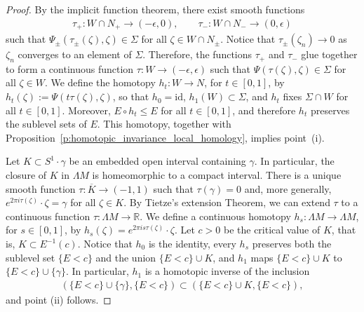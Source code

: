 \documentclass[reqno]{amsart}
\numberwithin{equation}{section}
\theoremstyle{personal}%
\theoremstyle{definition}
\newcommand{\R}{\mathds{R}}
\begin{document}
\begin{proof}
By the implicit function theorem, there exist smooth functions
\begin{align*}
\tau_+:W\cap N_+\to(-\epsilon,0),
\qquad
\tau_-:W\cap N_-\to(0,\epsilon)
\end{align*}
such that $\Psi_{\pm}(\tau_{\pm}(\zeta),\zeta)\in\Sigma$ for all $\zeta\in W\cap N_\pm$. Notice that $\tau_{\pm}(\zeta_n)\to 0$ as $\zeta_n$ converges to an element of $\Sigma$. Therefore, the functions $\tau_+$ and $\tau_-$ glue together to form a continuous function $\tau:W\to(-\epsilon,\epsilon)$ such that $\Psi(\tau(\zeta),\zeta)\in\Sigma$ for all $\zeta\in W$. We define the homotopy $h_t:W\to N$, for $t\in[0,1]$, by $h_t(\zeta):=\Psi(t\tau(\zeta),\zeta)$, so that $h_0=\mathrm{id}$, $h_1(W)\subset\Sigma$, and $h_t$ fixes $\Sigma\cap W$ for all $t\in[0,1]$. Moreover, $E\circ h_t\leq E$ for all $t\in[0,1]$, and therefore $h_t$ preserves the sublevel sets of $E$. This homotopy, together with Proposition~\ref{p:homotopic_invariance_local_homology}, implies point~(i).



Let $K\subset S^1\cdot\gamma$ be an embedded open interval containing $\gamma$. In particular, the closure of $K$ in $\Lambda M$ is homeomorphic to a compact interval. There is a unique smooth function $\tau:\overline K\to(-1,1)$ such that $\tau(\gamma)=0$ and, more generally, $e^{2\pi i\tau(\zeta)}\cdot\zeta =\gamma$ for all $\zeta\in K$. By Tietze's extension Theorem, we can extend $\tau$ to a continuous function $\tau:\Lambda M\to\R$. We define a continuous homotopy $h_s:\Lambda M\to\Lambda M$, for $s\in[0,1]$, by $h_s(\zeta)=e^{2\pi i s \tau(\zeta)}\cdot\zeta$. Let $c>0$ be the critical value of $K$, that is, $K\subset E^{-1}(c)$. Notice that $h_0$ is the identity, every $h_s$ preserves both the sublevel set $\{E<c\}$ and the union $\{E<c\}\cup K$, and $h_1$ maps $\{E<c\}\cup K$ to $\{E<c\}\cup \{\gamma\}$. In particular, $h_1$ is a homotopic inverse of the inclusion 
\begin{align*}
(\{E<c\}\cup\{\gamma\},\{E<c\}) \subset (\{E<c\}\cup K,\{E<c\}),
\end{align*}
and point (ii) follows.


\end{proof}
\end{document}
